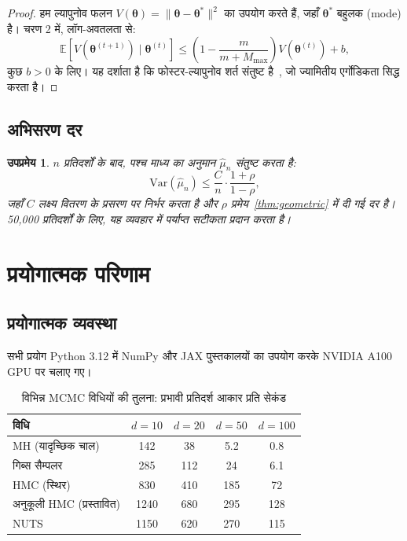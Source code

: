\documentclass[12pt,a4paper]{article}
\theoremstyle{plain}
\newtheorem{corollary}[theorem]{उपप्रमेय}
\theoremstyle{definition}
\theoremstyle{remark}
\begin{document}
\begin{proof}
हम ल्यापुनोव फलन $V(\bm{\theta}) = \|\bm{\theta} - \bm{\theta}^*\|^2$
का उपयोग करते हैं, जहाँ $\bm{\theta}^*$ बहुलक (mode) है।
चरण 2 में, लॉग-अवतलता से:
\[
\mathbb{E}[V(\bm{\theta}^{(t+1)}) \mid \bm{\theta}^{(t)}] \leq \left(1 - \frac{m}{m + M_{\max}}\right) V(\bm{\theta}^{(t)}) + b,
\]
कुछ $b > 0$ के लिए। यह दर्शाता है कि फोस्टर-ल्यापुनोव
शर्त संतुष्ट है~\citep{meyn2009}, जो ज्यामितीय
एर्गोडिकता सिद्ध करता है।
\end{proof}

\subsection{अभिसरण दर}

\begin{corollary}
\label{cor:convergence}
$n$ प्रतिदर्शों के बाद, पश्च माध्य का अनुमान $\hat{\mu}_n$ संतुष्ट करता है:
\begin{equation}
\label{eq:convergence}
\mathrm{Var}(\hat{\mu}_n) \leq \frac{C}{n} \cdot \frac{1 + \rho}{1 - \rho},
\end{equation}
जहाँ $C$ लक्ष्य वितरण के प्रसरण पर निर्भर करता है और
$\rho$ प्रमेय~\ref{thm:geometric} में दी गई दर है। 50,000
प्रतिदर्शों के लिए, यह व्यवहार में पर्याप्त सटीकता प्रदान करता है।
\end{corollary}

\section{प्रयोगात्मक परिणाम}
\label{sec:experiments}

\subsection{प्रयोगात्मक व्यवस्था}

सभी प्रयोग Python 3.12 में NumPy और JAX पुस्तकालयों का
उपयोग करके NVIDIA A100 GPU पर चलाए गए।

\begin{table}[ht]
\centering
\caption{विभिन्न MCMC विधियों की तुलना: प्रभावी प्रतिदर्श आकार प्रति सेकंड}
\label{tab:comparison}
\begin{tabular}{lcccc}
\toprule
विधि & $d = 10$ & $d = 20$ & $d = 50$ & $d = 100$ \\
\midrule
MH (यादृच्छिक चाल) & 142 & 38 & 5.2 & 0.8 \\
गिब्स सैम्पलर & 285 & 112 & 24 & 6.1 \\
HMC (स्थिर) & 830 & 410 & 185 & 72 \\
अनुकूली HMC (प्रस्तावित) & 1240 & 680 & 295 & 128 \\
NUTS & 1150 & 620 & 270 & 115 \\
\bottomrule
\end{tabular}
\end{table}
\end{document}
